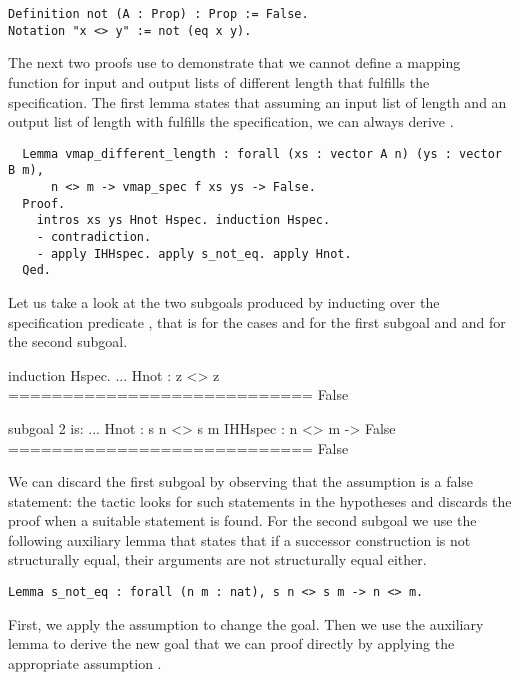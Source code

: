 \begin{verbatim}
Definition not (A : Prop) : Prop := False.
Notation "x <> y" := not (eq x y).
\end{verbatim}

The next two proofs use  to demonstrate that we cannot define a mapping function for input and output lists of different length that fulfills the specification.
The first lemma states that assuming an input list  of length  and an output list  of length  with  fulfills the specification, we can always derive .

\begin{verbatim}
  Lemma vmap_different_length : forall (xs : vector A n) (ys : vector B m),
      n <> m -> vmap_spec f xs ys -> False.
  Proof.
    intros xs ys Hnot Hspec. induction Hspec.
    - contradiction.
    - apply IHHspec. apply s_not_eq. apply Hnot.
  Qed.
\end{verbatim}

Let us take a look at the two subgoals produced by inducting over the specification predicate , that is for the cases  and   for the first subgoal and  and  for the second subgoal.

\begin{cproof}{induction Hspec.}
  ...
  Hnot : z <> z
  ============================
  False

subgoal 2 is:
  ...
  Hnot : s n <> s m
  IHHspec : n <> m -> False
  ============================
  False
\end{cproof}

We can discard the first subgoal by observing that the assumption  is a false statement: the tactic  looks for such statements in the hypotheses and discards the proof when a suitable statement is found.
For the second subgoal we use the following auxiliary lemma that states that if a successor construction is not structurally equal, their arguments are not structurally equal either.

\begin{verbatim}
Lemma s_not_eq : forall (n m : nat), s n <> s m -> n <> m.
\end{verbatim}

First, we apply the assumption  to change the goal.
Then we use the auxiliary lemma to derive the new goal  that we can proof directly by applying the appropriate assumption
.

